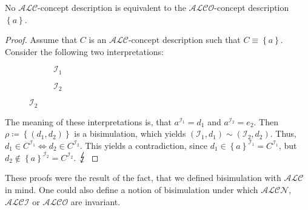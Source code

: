 \begin{prop}
	No $\mathcal{ALC}$-concept description is equivalent to the $\mathcal{ALCO}$-concept description $\left\{ a \right\}$.
\end{prop}
\begin{proof}
	Assume that $C$ is an $\mathcal{ALC}$-concept description such that $C \equiv \left\{ a \right\}$.
	Consider the following two interpretations:
	\begin{figure}[H]
		\centering
		\begin{subfigure}[t]{.475\textwidth}
			\centering
			\caption{$\mathcal{I}_1$}
		\end{subfigure}
		\hfill
		\begin{subfigure}[t]{.475\textwidth}
			\centering
			\caption{$\mathcal{I}_2$}
	\end{subfigure}
	\end{figure}
	The meaning of these interpretations is, that $a^{\mathcal{I}_1} = d_1$ and $a^{\mathcal{I}_2} = e_2$.
	Then $\rho \coloneqq \left\{ (d_1,d_2) \right\}$ is a bisimulation, which yields $\left( \mathcal{I}_1, d_1 \right) \sim \left( \mathcal{I}_2, d_2 \right)$.
	Thus, $d_1 \in C^{\mathcal{I}_1} \iff d_2 \in C^{\mathcal{I}_2}$.
	This yields a contradiction, since $d_1 \in \left\{ a \right\}^{\mathcal{I}_1} = C^{\mathcal{I}_1}$, but
	 $d_2 \notin \left\{ a \right\}^{\mathcal{I}_2} = C^{\mathcal{I}_2}$. $\contra$
\end{proof}
These proofs were the result of the fact, that we defined bisimulation with $\mathcal{ALC}$ in mind.
One could also define a notion of bisimulation under which $\mathcal{ALCN}$, $\mathcal{ALCI}$ or $\mathcal{ALCO}$ are invariant.

